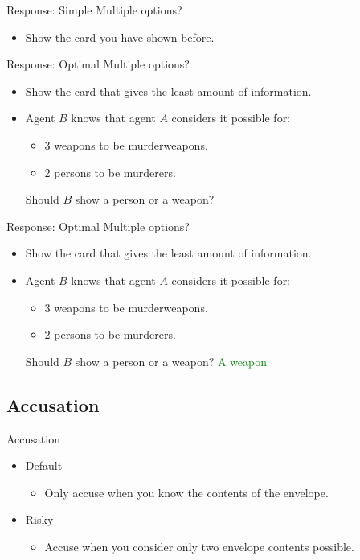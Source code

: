 \begin{frame}{Response: Simple}
Multiple options?
  \begin{itemize}
  \item Show the card you have shown before.
  \end{itemize}
\end{frame}

\begin{frame}{Response: Optimal}
Multiple options?
  \begin{itemize}
  \item Show the card that gives the least amount of information.
  \item Agent $B$ knows that agent $A$ considers it possible for:
  \begin{itemize}
    \item 3 weapons to be murderweapons.
    \item 2 persons to be murderers. 
  \end{itemize}
  Should $B$ show a person or a weapon?
  \end{itemize}
\end{frame}

\begin{frame}{Response: Optimal}
Multiple options?
  \begin{itemize}
  \item Show the card that gives the least amount of information.
  \item Agent $B$ knows that agent $A$ considers it possible for:
  \begin{itemize}
    \item 3 weapons to be murderweapons.
    \item 2 persons to be murderers. 
  \end{itemize}
  Should $B$ show a person or a weapon?  \textcolor{green}{A weapon}
  \end{itemize}
\end{frame}

\subsection{Accusation}
\begin{frame} {Accusation}
\begin{itemize}
  \item Default
  \begin{itemize}
   \item Only accuse when you know the contents of the envelope. 
  \end{itemize}
  
  \item Risky
  \begin{itemize}
  \item Accuse when you consider only two envelope contents possible.
  \end{itemize}

\end{itemize}
\end{frame} 

